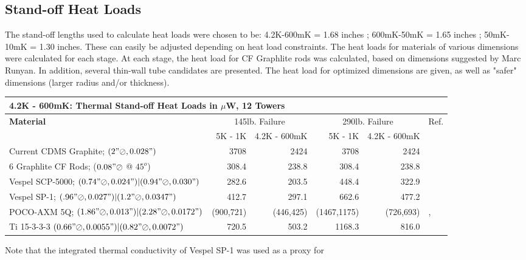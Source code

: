 \documentclass{article}
\begin{document}
\subsection{Stand-off Heat Loads}

The stand-off lengths used to calculate heat loads were chosen to be: 4.2K-600mK = 1.68 inches ; 600mK-50mK = 1.65 inches ; 50mK-10mK = 1.30 inches. These can easily be adjusted depending on heat load constraints. The heat loads for materials of various dimensions were calculated for each stage. At each stage, the heat load for CF Graphlite rods was calculated, based on dimensions suggested by Marc Runyan. In addition, several thin-wall tube candidates are presented. The heat load for optimized dimensions are given, as well as "safer" dimensions (larger  radius and/or thickness).

\begin{table}[h]
\begin{small}
\begin{threeparttable}
\begin{tabular}{lrrrrl}
  \multicolumn{5}{l}{{\Large 4.2K - 600mK: Thermal Stand-off Heat Loads in $\mu$W, 12 Towers}} \\
\toprule
\bf{{\large Material}}& \multicolumn{2}{c}{145lb. Failure} & \multicolumn{2}{c}{290lb. Failure} & Ref.\\
\cmidrule(r){2-5}
& 5K - 1K & 4.2K - 600mK & 5K - 1K & 4.2K - 600mK & \\
Current CDMS Graphite; $(2"\oslash,0.028")$  & 3708 & 2424 & 3708 & 2424 & \cite{lem}\\
6 Graphlite CF Rods; ($0.08" \oslash$ @ $45^{o}$) & 308.4 & 238.8 & 308.4 & 238.8 & \cite{run}\\
Vespel SCP-5000; $(0.74"\oslash,0.024")|(0.94"\oslash,0.030")$ & 282.6\tnote{\dag} & 203.5\tnote{\dag} & 448.4\tnote{\dag} & 322.9\tnote{\dag} & \cite{run}\\
Vespel SP-1; $(.96"\oslash,0.027")|(1.2"\oslash,0.0347")$ & 412.7 & 297.1 & 662.6 & 477.2 & \cite{run}\\
POCO-AXM 5Q; $(1.86"\oslash,0.013")|(2.28"\oslash,0.0172")$ & (900,721) & (446,425) & (1467,1175) & (726,693) & \cite{woo:gr},\cite{run}\\
Ti 15-3-3-3 $(0.66"\oslash,0.0055")|(0.82"\oslash,0.0072")$ & 720.5 & 503.2 & 1168.3 & 816.0 & \cite{wik}\\
\bottomrule
\end{tabular}
\begin{tablenotes}
\item[\dag] Note that the integrated thermal conductivity of Vespel SP-1 was used as a proxy for

\end{tablenotes}
\end{threeparttable}
\end{small}
\end{table}
\end{document}
